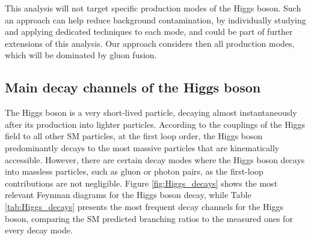 This analysis will not target specific production modes of the Higgs boson. Such an approach can help reduce background contamination, by individually studying and applying dedicated techniques to each mode, and could be part of further extensions of this analysis. Our approach considers then all production modes, which will be dominated by gluon fusion.

\subsection{Main decay channels of the Higgs boson}

The Higgs boson is a very short-lived particle, decaying almost instantaneously after its production into lighter particles. According to the couplings of the Higgs field to all other SM particles, at the first loop order, the Higgs boson predominantly decays to the most massive particles that are kinematically accessible. However, there are certain decay modes where the Higgs boson decays into massless particles, such as gluon or photon pairs, as the first-loop contributions are not negligible. Figure \ref{fig:Higgs_decays} shows the most relevant Feynman diagrams for the Higgs boson decay, while Table \ref{tab:Higgs_decays} presents the most frequent decay channels for the Higgs boson, comparing the SM predicted branching ratios to the measured ones for every decay mode.

